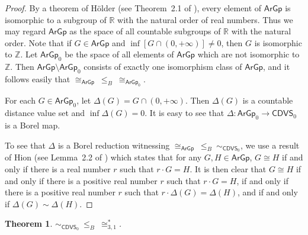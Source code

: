 \documentclass{amsart}
\newtheorem{theorem}{Theorem}[section]
\theoremstyle{definition}
\theoremstyle{remark}
\begin{document}
\begin{proof} By a theorem of H\"{o}lder (see Theorem~2.1 of \cite{CMMRS}), every element of $\mathsf{ArGp}$ is isomorphic to a subgroup of $\mathbb{R}$ with the natural order of real numbers. Thus we may regard $\mathsf{ArGp}$ as the space of all countable subgroups of $\mathbb{R}$ with the natural order. Note that if $G\in \mathsf{ArGp}$ and $\inf [G\cap (0,+\infty)]\neq 0$, then $G$ is isomorphic to $\mathbb{Z}$. Let $\mathsf{ArGp}_0$ be the space of all elements of $\mathsf{ArGp}$ which are not isomorphic to $\mathbb{Z}$. Then $\mathsf{ArGp}\setminus\mathsf{ArGp}_0$ consists of exactly one isomorphism class of $\mathsf{ArGp}$, and it follows easily that $\cong_{\mathsf{ArGp}}\ \leq_B\  \cong_{\mathsf{ArGp}_0}$. 

For each $G\in\mathsf{ArGp}_0$, let $\Delta(G)=G\cap(0,+\infty)$. Then $\Delta(G)$ is a countable distance value set and $\inf \Delta(G)=0$. It is easy to see that $\Delta\colon \mathsf{ArGp}_0\to \mathsf{CDVS}_0$ is a Borel map. 

To see that $\Delta$ is a Borel reduction witnessing $\cong_{\mathsf{ArGp}}\ \leq_B\ \sim_{\mathsf{CDVS}_0}$, we use a result of Hion (see Lemma~2.2 of \cite{CMMRS}) which states that for any $G, H\in \mathsf{ArGp}$, $G\cong H$ if and only if there is a real number $r$ such that $r\cdot G=H$. It is then clear that $G\cong H$ if and only if there is a positive real number $r$ such that $r\cdot G=H$, if and only if there is a positive real number $r$ such that $r\cdot \Delta(G)=\Delta(H)$, and if and only if $\Delta(G)\sim \Delta(H)$.
\end{proof}


\begin{theorem}\label{thm:cong31} $\sim_{\mathsf{CDVS}_0}\ \leq_B\ \cong^*_{3,1}$.
\end{theorem}
\end{document}
